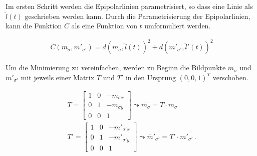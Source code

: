 Im ersten Schritt werden die Epipolarlinien parametrisiert, so dass eine Linie als $\hat{l}(t)$ geschrieben werden kann. Durch die Parametrisierung der Epipolarlinien, kann die Funktion $C$ als eine Funktion von $t$ umformuliert werden.


\begin{gather}
	C(m_\sigma,m'_{\sigma'}) = d(m_\sigma,\hat{l}(t))^2 + d(m'_{\sigma'},\hat{l}'(t))^2
\end{gather}


%
%
Um die Minimierung zu vereinfachen, werden zu Beginn die Bildpunkte $m_\sigma$ und $m'_{\sigma'} $ mit jeweils einer Matrix $T$ und $T'$ in den Ursprung $(0,0,1)^T$ verschoben. 



\begin{gather}
	T = \begin{bmatrix}
	1&0&-m_{\sigma x}\\
	0&1&-m_{\sigma y}\\
	0&0&1
	\end{bmatrix} \leadsto \bar{m_\sigma} = T\cdot m_\sigma\\
	T' = \begin{bmatrix}
	1&0&-m'_{\sigma'x}\\
	0&1&-m'_{\sigma'y}\\
	0&0&1
	\end{bmatrix} \leadsto 	\bar{m}'_{\sigma'} = T' \cdot m'_{\sigma'} \, .
\end{gather} \\

